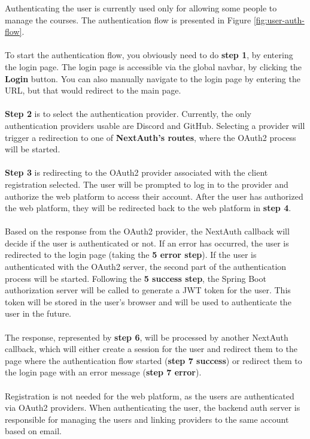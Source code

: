 \noindent Authenticating the user is currently used only for allowing some people to manage the courses. The authentication flow is presented in Figure \ref{fig:user-auth-flow}.
\\\\
\noindent To start the authentication flow, you obviously need to do \textbf{step 1}, by entering the login page. The login page is accessible via the global navbar, by clicking the \textbf{Login} button. You can also manually navigate to the login page by entering the URL, but that would redirect to the main page.
\\\\
\noindent \textbf{Step 2} is to select the authentication provider. Currently, the only authentication providers usable are Discord and GitHub. Selecting a provider will trigger a redirection to one of \textbf{NextAuth's routes}, where the OAuth2 process will be started.
\\\\
\noindent \textbf{Step 3} is redirecting to the OAuth2 provider associated with the client registration selected. The user will be prompted to log in to the provider and authorize the web platform to access their account. After the user has authorized the web platform, they will be redirected back to the web platform in \textbf{step 4}.
\\\\
\noindent Based on the response from the OAuth2 provider, the NextAuth callback will decide if the user is authenticated or not. If an error has occurred, the user is redirected to the login page (taking the \textbf{5 error step}). If the user is authenticated with the OAuth2 server, the second part of the authentication process will be started. Following the \textbf{5 success step}, the Spring Boot authorization server will be called to generate a JWT token for the user. This token will be stored in the user's browser and will be used to authenticate the user in the future.
\\\\
\noindent The response, represented by \textbf{step 6}, will be processed by another NextAuth callback, which will either create a session for the user and redirect them to the page where the authentication flow started (\textbf{step 7 success}) or redirect them to the login page with an error message (\textbf{step 7 error}).
\\\\
\noindent Registration is not needed for the web platform, as the users are authenticated via OAuth2 providers. When authenticating the user, the backend auth server is responsible for managing the users and linking providers to the same account based on email.

